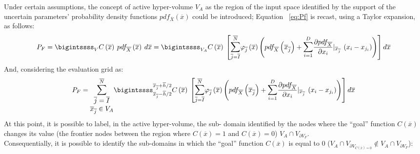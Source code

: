 Under certain assumptions, the concept of active hyper-volume
$V_{A}$ as the region of the input space identified by the support of
the uncertain parameters’ probability density functions
$pdf_{\overline{X}}\left ( \overline{x} \right )$ could be introduced;
Equation ~\ref{eq:Pf} is recast, using a Taylor expansion, as follows:
 \begin{equation}
P_{F}= \bigintssss_{V} C\left ( \overline{x} \right )\: pdf_{\overline{X}}\left (
\overline{x}  \right )\: d\overline{x} =\bigintssss_{V_{A}}C\left ( \overline{x}
\right )\:
\left [
\mathlarger{\sum}_{\overline{j}=\overline{I}}^{\overline{N}}\varphi_{\overline{j}}\left (
\overline{x} \right )
\left ( pdf_{\overline{X}}\left ( \overline{x}_{\overline{j}} \right ) +
\mathlarger{\sum}_{i=1}^{D} \frac{\partial pdf_{\overline{X}}}{\partial x_{i}}|
_{\overline{x}_{\overline{j}}} \: \left ( x_{i} - x_{j_{i}} \right ) \right ) \right
] d\overline{x}
 \end{equation}
And, considering the evaluation grid as:
\begin{equation}
\label{eq:PfEq}
P_{F}= \mathlarger{\sum}_{\begin{matrix}
\overline{j}=\overline{I} \\ \overline{x}_{\overline{j}} \in V_{A} \end{matrix}}^{\overline{N}}
\bigintssss_{\overline{x}_{\overline{j}} - \overline{h}/2}^{\overline{x}_{\overline{j}} + \overline{h}/2} C\left ( \overline{x} \right )\:
\left [  \mathlarger{\sum}_{\overline{j}=\overline{I}}^{\overline{N}}\varphi_{\overline{j}}\left ( \overline{x} \right )
\left ( pdf_{\overline{X}}\left ( \overline{x}_{\overline{j}} \right ) +
\mathlarger{\sum}_{i=1}^{D} \frac{\partial pdf_{\overline{X}}}{\partial x_{i}}|_{\overline{x}_{\overline{j}}} \: \left ( x_{i} - x_{j_{i}} \right ) \right ) \right ] d\overline{x}
\end{equation}
At this point, it is possible to label, in the active hyper-volume, the sub-
domain identified by the nodes where the ``goal'' function
$C(\overline{x})$ changes its value (the frontier nodes between the
region where $C(\overline{x})=1$ and $C(\overline{x})=0$) $V_{A} \cap
V_{\partial V_{F}}$.
\\ Consequentially, it is possible to identify the sub-domains in which the  ``goal''  function $C(\overline{x})$ is equal to $0$ ($V_{A} \cap V_{\partial V_{C(\overline{x})=0}} \notin V_{A} \cap V_{\partial V_{F}}$):

